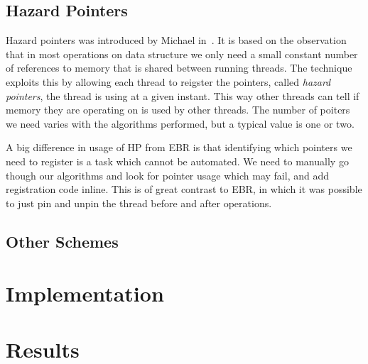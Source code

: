 \documentclass[b5paper,twoside]{report}
\begin{document}


\section{Hazard Pointers}

Hazard pointers was introduced by Michael in~\cite{michael2004hazard}.
It is based on the observation that in most operations on data structure
we only need a small constant number of references to memory that is shared
between running threads. The technique exploits this by allowing each
thread to reigster the pointers, called \emph{hazard pointers},
the thread is using at a given instant. This way other threads can tell
if memory they are operating on is used by other threads.
The number of poiters we need varies with the algorithms performed,
but a typical value is one or two.

A big difference in usage of HP from EBR is that identifying which
pointers we need to register is a task which cannot be automated.
We need to manually go though our algorithms and look for pointer
usage which may fail, and add registration code inline.
This is of great contrast to EBR, in which it was possible to
just pin and unpin the thread before and after operations.



\section{Other Schemes}


\chapter{Implementation}



\chapter{Results}
\end{document}
